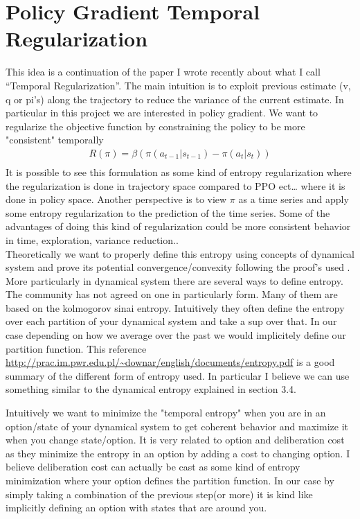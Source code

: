 \section{Policy Gradient Temporal Regularization}

This idea is a continuation of the paper I wrote recently about what I call “Temporal Regularization”. The main intuition is to exploit previous estimate (v, q or pi’s) along the trajectory to reduce the variance of the current estimate. In particular in this project we are interested in policy gradient. We want to regularize the objective function by constraining the policy to be more "consistent" temporally 
\begin{equation}
\begin{split}
    R(\pi) = \beta ( \pi(a_{t-1}|s_{t-1}) - \pi(a_t|s_t)) \\
\end{split}
\end{equation}
It is possible to see this formulation as some kind of entropy regularization where the regularization is done in trajectory space compared to PPO ect… where it is done in policy space. Another perspective is to view $\pi$ as a time series and apply some entropy regularization to the prediction of the time series. Some of the advantages of doing this kind of regularization could be more consistent behavior in time, exploration, variance reduction.. \\
Theoretically we want to properly define this entropy using concepts of dynamical system and prove its potential convergence/convexity following the proof's used \cite{neu2017unified}.\\
More particularly in dynamical system there are several ways to define entropy. The community has not agreed on one in particularly form. Many of them are based on the kolmogorov sinai entropy. Intuitively they often define the entropy over each partition of your dynamical system and take a sup over that. In our case depending on how we average over the past we would implicitely define our partition function. This reference \url{http://prac.im.pwr.edu.pl/~downar/english/documents/entropy.pdf} is a good summary of the different form of entropy used. In particular I believe we can use something similar to the dynamical entropy explained in section 3.4.

Intuitively we want to minimize the "temporal entropy" when you are in an option/state of your dynamical system to get coherent behavior and maximize it when you change state/option. It is very related to option and deliberation cost \cite{harb2017waiting} as they minimize the entropy in an option by adding a cost to changing option. I believe deliberation cost can actually be cast as some kind of entropy minimization where your option defines the partition function. In our case by simply taking a combination of the previous step(or more) it is kind like implicitly defining an option with states that are around you.
